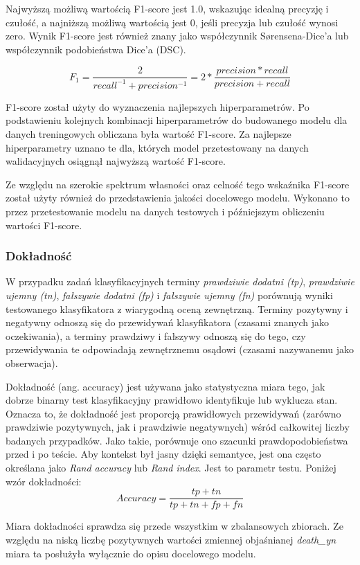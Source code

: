 \documentclass[polish, twoside, 12pt, a4paper]{article}
\theoremstyle{definition}
\theoremstyle{plain}
\theoremstyle{remark}
\begin{document}
Najwyższą możliwą wartością F1-score jest 1.0, wskazując idealną precyzję i czułość, a najniższą możliwą wartością jest 0, jeśli precyzja lub czułość wynosi zero. Wynik F1-score jest również znany jako współczynnik Sørensena-Dice'a lub współczynnik podobieństwa Dice'a (DSC).

\[ F_1 = \frac{2}{recall^{-1} + precision^{-1}} = 2 * \frac{precision * recall}{precision + recall} \]

F1-score został użyty do wyznaczenia najlepszych hiperparametrów. Po podstawieniu kolejnych kombinacji hiperparametrów do budowanego modelu dla danych treningowych obliczana była wartość F1-score. Za najlepsze hiperparametry uznano te dla, których model przetestowany na danych walidacyjnych osiągnął najwyższą wartość F1-score. 

Ze względu na szerokie spektrum własności oraz celność tego wskaźnika F1-score został użyty również do przedstawienia jakości docelowego modelu. Wykonano to przez przetestowanie modelu na danych testowych i późniejszym obliczeniu wartości F1-score.

\subsubsection{Dokładność}

W przypadku zadań klasyfikacyjnych terminy \emph{prawdziwie dodatni (tp)}, \emph{prawdziwie ujemny (tn)}, \emph{fałszywie dodatni (fp)} i \emph{fałszywie ujemny (fn)} porównują wyniki testowanego klasyfikatora z wiarygodną oceną zewnętrzną. Terminy pozytywny i negatywny odnoszą się do przewidywań klasyfikatora (czasami znanych jako oczekiwania), a terminy prawdziwy i fałszywy odnoszą się do tego, czy przewidywania te odpowiadają zewnętrznemu osądowi (czasami nazywanemu jako obserwacja). \cite{fawcett2005}

Dokładność (ang. accuracy) jest używana jako statystyczna miara tego, jak dobrze binarny test klasyfikacyjny prawidłowo identyfikuje lub wyklucza stan. Oznacza to, że dokładność jest proporcją prawidłowych przewidywań (zarówno prawdziwie pozytywnych, jak i prawdziwie negatywnych) wśród całkowitej liczby badanych przypadków. Jako takie, porównuje ono szacunki prawdopodobieństwa przed i po teście. Aby kontekst był jasny dzięki semantyce, jest ona często określana jako \emph{Rand accuracy} lub \emph{Rand index}. Jest to parametr testu.\cite{powers2015} Poniżej wzór dokładności:
\[ Accuracy = \frac{tp + tn}{tp + tn + fp + fn} \]

Miara dokładności sprawdza się przede wszystkim w zbalansowych zbiorach. Ze względu na niską liczbę pozytywnych wartości zmiennej objaśnianej \emph{death\_yn} miara ta posłużyła wyłącznie do opisu docelowego modelu.
\end{document}
